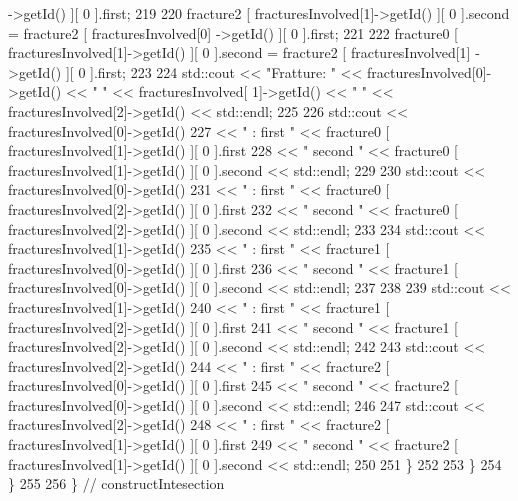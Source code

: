 \begin{DoxyCode}
      ->getId() ][ 0 ].first;
219      
220                 fracture2 [ fracturesInvolved[1]->getId() ][ 0 ].second = fracture2 [ fracturesInvolved[0]
      ->getId() ][ 0 ].first;
221      
222                 fracture0 [ fracturesInvolved[1]->getId() ][ 0 ].second = fracture2 [ fracturesInvolved[1]
      ->getId() ][ 0 ].first;
223      
224                 std::cout << \textcolor{stringliteral}{"Fratture: "} << fracturesInvolved[0]->getId() << \textcolor{stringliteral}{"     "} << fracturesInvolved[
      1]->getId() << \textcolor{stringliteral}{"     "} << fracturesInvolved[2]->getId() << std::endl;
225 
226                 std::cout << fracturesInvolved[0]->getId()
227                                 << \textcolor{stringliteral}{" :   first "} << fracture0 [ fracturesInvolved[1]->getId() ][ 0 ].first
228                                 << \textcolor{stringliteral}{" second "} << fracture0 [ fracturesInvolved[1]->getId() ][ 0 ].second <<
       std::endl;
229     
230                 std::cout << fracturesInvolved[0]->getId()
231                                 << \textcolor{stringliteral}{" :   first "} << fracture0 [ fracturesInvolved[2]->getId() ][ 0 ].first
232                                 << \textcolor{stringliteral}{" second "} << fracture0 [ fracturesInvolved[2]->getId() ][ 0 ].second <<
       std::endl;
233     
234                 std::cout << fracturesInvolved[1]->getId()
235                                 << \textcolor{stringliteral}{" :   first "} << fracture1 [ fracturesInvolved[0]->getId() ][ 0 ].first
236                                 << \textcolor{stringliteral}{" second "} << fracture1 [ fracturesInvolved[0]->getId() ][ 0 ].second <<
       std::endl;
237     
238     
239                 std::cout << fracturesInvolved[1]->getId()
240                                 << \textcolor{stringliteral}{" :   first "} << fracture1 [ fracturesInvolved[2]->getId() ][ 0 ].first
241                                 << \textcolor{stringliteral}{" second "} << fracture1 [ fracturesInvolved[2]->getId() ][ 0 ].second <<
       std::endl;
242     
243                 std::cout << fracturesInvolved[2]->getId()
244                                 << \textcolor{stringliteral}{" :   first "} << fracture2 [ fracturesInvolved[0]->getId() ][ 0 ].first
245                                 << \textcolor{stringliteral}{" second "} << fracture2 [ fracturesInvolved[0]->getId() ][ 0 ].second <<
       std::endl;
246     
247                 std::cout << fracturesInvolved[2]->getId()
248                                 << \textcolor{stringliteral}{" :   first "} << fracture2 [ fracturesInvolved[1]->getId() ][ 0 ].first
249                                 << \textcolor{stringliteral}{" second "} << fracture2 [ fracturesInvolved[1]->getId() ][ 0 ].second <<
       std::endl;
250     
251             \}
252 
253         \}
254     \}
255 
256 \} \textcolor{comment}{// constructIntesection}
\end{DoxyCode}
